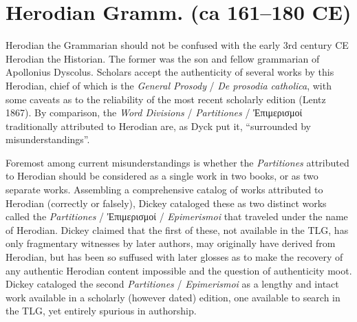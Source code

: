 %
%
\chapter{Herodian Gramm. (ca 161--180 CE)}%
\vspace*{3mm}%
\justifying
%
\noindent{}Herodian the Grammarian should not be confused with the early 3rd century CE Herodian the Historian. %
The former was the son and fellow grammarian of Apollonius Dyscolus. %
Scholars accept the authenticity of several works by this Herodian, %
chief of which is the \textit{General Prosody} / \textit{De prosodia catholica}, %
with some caveats as to the reliability of the most recent scholarly edition (Lentz 1867). %
By comparison, the \textit{Word Divisions} / \textit{Partitiones} / Ἐπιμερισμοί traditionally attributed to Herodian are, as Dyck put it, %
“surrounded by misunderstandings”. %

Foremost among current misunderstandings is whether the \textit{Partitiones} attributed to Herodian %
should be considered as a single work in two books, or as two separate works. %
Assembling a comprehensive catalog of works attributed to Herodian (correctly or falsely), %
Dickey cataloged these as two distinct works called the \textit{Partitiones} / %
Ἐπιμερισμοί / \textit{Epimerismoi} that traveled under the name of Herodian. %
Dickey claimed that the first of these, not available in the TLG, %
has only fragmentary witnesses by later authors, %
may originally have derived from Herodian,
but has been so suffused with later glosses as to make the recovery of %
any authentic Herodian content impossible and the question of authenticity moot. %
Dickey cataloged the second \textit{Partitiones} / \textit{Epimerismoi} as a lengthy and intact work %
available in a scholarly (however dated) edition, %
one available to search in the TLG, %
yet entirely spurious in authorship. %

